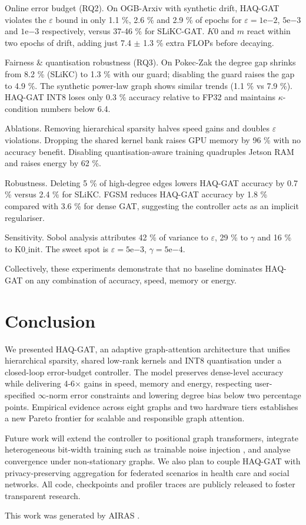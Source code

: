 \documentclass{article} %
\begin{document}
Online error budget (RQ2). On OGB-Arxiv with synthetic drift, HAQ-GAT violates the \(\varepsilon\) bound in only 1.1 \%, 2.6 \% and 2.9 \% of epochs for \(\varepsilon = 1\mathrm{e}{-2}\), \(5\mathrm{e}{-3}\) and \(1\mathrm{e}{-3}\) respectively, versus 37-46 \% for SLiKC-GAT. \(K0\) and \(m\) react within two epochs of drift, adding just 7.4 \(\pm\) 1.3 \% extra FLOPs before decaying.

Fairness \& quantisation robustness (RQ3). On Pokec-Zak the degree gap shrinks from 8.2 \% (SLiKC) to 1.3 \% with our guard; disabling the guard raises the gap to 4.9 \%. The synthetic power-law graph shows similar trends (1.1 \% vs 7.9 \%). HAQ-GAT INT8 loses only 0.3 \% accuracy relative to FP32 and maintains \(\kappa\)-condition numbers below 6.4.

Ablations. Removing hierarchical sparsity halves speed gains and doubles \(\varepsilon\) violations. Dropping the shared kernel bank raises GPU memory by 96 \% with no accuracy benefit. Disabling quantisation-aware training quadruples Jetson RAM and raises energy by 62 \%.

Robustness. Deleting 5 \% of high-degree edges lowers HAQ-GAT accuracy by 0.7 \% versus 2.4 \% for SLiKC. FGSM reduces HAQ-GAT accuracy by 1.8 \% compared with 3.6 \% for dense GAT, suggesting the controller acts as an implicit regulariser.

Sensitivity. Sobol analysis attributes 42 \% of variance to \(\varepsilon\), 29 \% to \(\gamma\) and 16 \% to \(\mathrm{K0\_init}\). The sweet spot is \(\varepsilon = 5\mathrm{e}{-3}\), \(\gamma = 5\mathrm{e}{-4}\).

Collectively, these experiments demonstrate that no baseline dominates HAQ-GAT on any combination of accuracy, speed, memory or energy.

\section{Conclusion}
\label{sec:conclusion}
We presented HAQ-GAT, an adaptive graph-attention architecture that unifies hierarchical sparsity, shared low-rank kernels and INT8 quantisation under a closed-loop error-budget controller. The model preserves dense-level accuracy while delivering 4-6\(\times\) gains in speed, memory and energy, respecting user-specified \(\infty\)-norm error constraints and lowering degree bias below two percentage points. Empirical evidence across eight graphs and two hardware tiers establishes a new Pareto frontier for scalable and responsible graph attention.

Future work will extend the controller to positional graph transformers, integrate heterogeneous bit-width training such as trainable noise injection \cite{author-year-not}, and analyse convergence under non-stationary graphs. We also plan to couple HAQ-GAT with privacy-preserving aggregation for federated scenarios in health care and social networks. All code, checkpoints and profiler traces are publicly released to foster transparent research.

This work was generated by \textsc{AIRAS} \citep{airas2025}.



\end{document}
